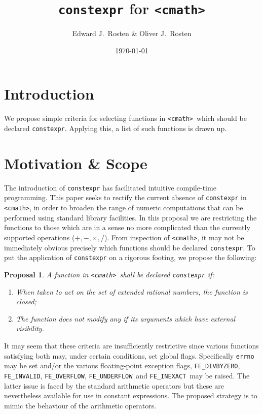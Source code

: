 \documentclass[prd,preprint,amsmath,amssymb,nofootinbib,eqsecnum]{revtex4-1}
\newcommand{\constexpr}{\code{constexpr}\xspace}
\newcommand{\code}[1]{{\tt #1}}
\newcommand{\header}[1]{{\tt <#1>}}
\newcommand{\cmath}{\header{cmath}}
\newcommand{\FEINVALID}{{\tt FE\_INVALID}}
\newcommand{\FEDIVBYZERO}{{\tt FE\_DIVBYZERO}}
\newcommand{\FEINEXACT}{{\tt FE\_INEXACT}}
\newcommand{\FEUNDERFLOW}{{\tt FE\_UNDERFLOW}}
\newcommand{\FEOVERFLOW}{{\tt FE\_OVERFLOW}}
\newcommand{\Operators}{\ensuremath{+,-,\times,/}}
\newtheorem*{proposal*}{Proposal}
\begin{document}
\title{\constexpr for \cmath}
\author{Edward J.~Rosten \& Oliver J.~Rosten}
\date{\today}
\maketitle

\section{Introduction}

We propose simple criteria for selecting functions in \cmath\ which should be
declared \constexpr. Applying this, a list of such functions is drawn up.

\section{Motivation \& Scope}

The introduction of \constexpr has facilitated intuitive compile-time
programming. This paper seeks to rectify the current absence of \constexpr in
\cmath, in order to broaden the range of numeric computations that can be
performed using standard library facilities. In this proposal we are restricting
the functions to those which are in a sense no more complicated than the
currently supported operations (\Operators).
From inspection of \cmath, it may
not be immediately obvious precisely which functions should be declared
\constexpr. To put the application of \constexpr on a rigorous footing, we
propose the following:
\begin{proposal*}
	A function in \cmath\ shall be declared \constexpr if:
	\begin{enumerate}
		\item When taken to act on the set of extended rational numbers, the function is closed;
		
		\item The function does not modify any if its arguments which have external visibility.
	\end{enumerate}
\end{proposal*}

It may seem that these criteria are insufficiently restrictive since various
functions satisfying both may, under certain conditions, set global flags.
Specifically \code{errno} may be set and/or the various floating-point
exception flags, \FEDIVBYZERO, \FEINVALID, \FEOVERFLOW, \FEUNDERFLOW\ and
\FEINEXACT\ may be raised. The latter issue is 
faced by the standard
arithmetic operators but these are nevertheless available for use in constant
expressions. The proposed strategy is to mimic the behaviour of the arithmetic
operators.
\end{document}
